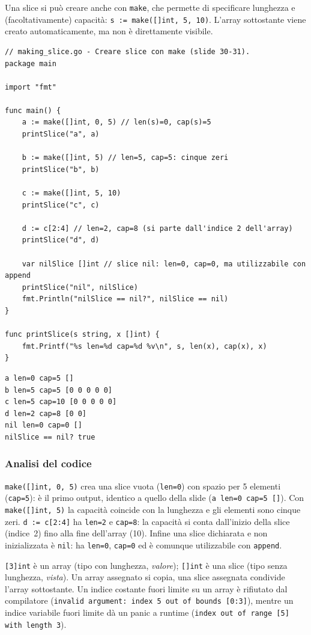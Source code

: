 \documentclass[11pt,a4paper]{report}
\newcommand{\cod}[1]{\texttt{#1}}
\begin{document}
Una slice si può creare anche con \cod{make}, che permette di specificare
lunghezza e (facoltativamente) capacità: \cod{s := make([]int, 5, 10)}. L'array
sottostante viene creato automaticamente, ma non è direttamente visibile.

\begin{lstlisting}[style=gocode,caption={\texttt{04\_data\_structures/making\_slice.go}}]
// making_slice.go - Creare slice con make (slide 30-31).
package main

import "fmt"

func main() {
	a := make([]int, 0, 5) // len(s)=0, cap(s)=5
	printSlice("a", a)

	b := make([]int, 5) // len=5, cap=5: cinque zeri
	printSlice("b", b)

	c := make([]int, 5, 10)
	printSlice("c", c)

	d := c[2:4] // len=2, cap=8 (si parte dall'indice 2 dell'array)
	printSlice("d", d)

	var nilSlice []int // slice nil: len=0, cap=0, ma utilizzabile con append
	printSlice("nil", nilSlice)
	fmt.Println("nilSlice == nil?", nilSlice == nil)
}

func printSlice(s string, x []int) {
	fmt.Printf("%s len=%d cap=%d %v\n", s, len(x), cap(x), x)
}
\end{lstlisting}
\begin{lstlisting}[style=output]
a len=0 cap=5 []
b len=5 cap=5 [0 0 0 0 0]
c len=5 cap=10 [0 0 0 0 0]
d len=2 cap=8 [0 0]
nil len=0 cap=0 []
nilSlice == nil? true
\end{lstlisting}

\subsubsection*{Analisi del codice}

\cod{make([]int, 0, 5)} crea una slice vuota (\cod{len=0}) con spazio per 5
elementi (\cod{cap=5}): è il primo output, identico a quello della slide
(\cod{a len=0 cap=5 []}). Con \cod{make([]int, 5)} la capacità coincide con la
lunghezza e gli elementi sono cinque zeri. \cod{d := c[2:4]} ha \cod{len=2} e
\cod{cap=8}: la capacità si conta dall'inizio della slice (indice~2) fino alla
fine dell'array (10). Infine una slice dichiarata e non inizializzata è
\cod{nil}: ha \cod{len=0}, \cod{cap=0} ed è comunque utilizzabile con
\cod{append}.

\begin{attenzione}
\cod{[3]int} è un array (tipo con lunghezza, \emph{valore}); \cod{[]int}
è una slice (tipo senza lunghezza, \emph{vista}). Un array assegnato si copia,
una slice assegnata condivide l'array sottostante. Un indice costante fuori
limite su un array è rifiutato dal compilatore (\texttt{invalid argument: index 5
out of bounds [0:3]}), mentre un indice variabile fuori limite dà un panic a
runtime (\texttt{index out of range [5] with length 3}).
\end{attenzione}
\end{document}
